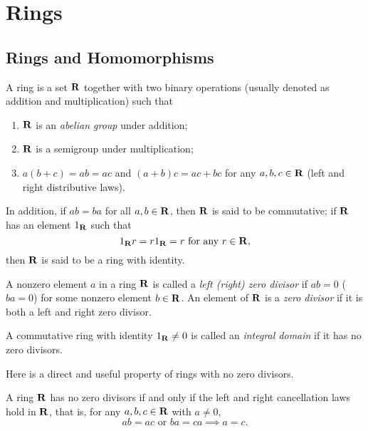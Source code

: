 \chapter{Rings}
\section{Rings and Homomorphisms}
\begin{defn}
A ring is a set $\mathbf{R}$ together with two binary operations (usually denoted 
as addition and multiplication) such that 
\begin{enumerate}
    \item $\mathbf{R}$ is an \emph{abelian group} under addition;
    \item $\mathbf{R}$ is a semigroup under multiplication;
    \item $a (b + c) = ab = ac$ and $(a + b)c = ac + bc$ for any $a, b, c 
    \in \mathbf{R}$ (left and right distributive laws).
\end{enumerate}

In addition, if $ab = ba$ for all $a, b \in \mathbf{R}$, then $\mathbf{R}$ is said to 
be commutative; if $\mathbf{R}$ has an element $1_{\mathbf{R}}$ such that 
\begin{equation*}
    1_{\mathbf{R}} r = r 1_{\mathbf{R}} = r \text{ for any } r \in \mathbf{R}, 
\end{equation*}
then $\mathbf{R}$ is said to be a ring with identity.
\end{defn}

\begin{defn}
A nonzero element $a$ in a ring $\mathbf{R}$ is called a \emph{left (\resp right) 
zero divisor} if $ab = 0$ (\resp $ba = 0$) for some nonzero element 
$b \in \mathbf{R}$. 
An element of $\mathbf{R}$ is a \emph{zero divisor} if it is both a left and right 
zero divisor. 

A commutative ring with identity $1_{\mathbf{R}} \neq 0$ is called an \emph{integral 
domain} if it has no zero divisors. 
\end{defn}
Here is a direct and useful property of rings with no zero divisors. 
\begin{prop}
A ring $\mathbf{R}$ has no zero divisors if and only if the left and right 
cancellation laws hold in $\mathbf{R}$, that is, for any $a, b, c \in \mathbf{R}$ with 
$a \neq 0$, 
\begin{equation}
    ab = ac \text{ or } ba = ca \implies a = c.
\end{equation} 
\end{prop}

